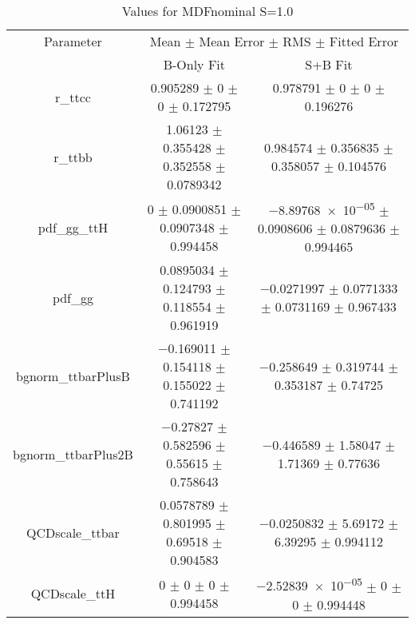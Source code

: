 \begin{table}
\centering
\caption{Values for MDFnominal S=1.0}
\begin{tabular}{ccc}
\toprule
Parameter & \multicolumn{2}{c}{Mean $\pm$ Mean Error $\pm$ RMS $\pm$ Fitted Error}\\
 & B-Only Fit & S+B Fit\\
\midrule
r\_ttcc & \num{0.905289} $\pm$ \num{0} $\pm$ \num{0} $\pm$ \num{0.172795} & \num{0.978791} $\pm$ \num{0} $\pm$ \num{0} $\pm$ \num{0.196276}\\
r\_ttbb & \num{1.06123} $\pm$ \num{0.355428} $\pm$ \num{0.352558} $\pm$ \num{0.0789342} & \num{0.984574} $\pm$ \num{0.356835} $\pm$ \num{0.358057} $\pm$ \num{0.104576}\\
pdf\_gg\_ttH & \num{0} $\pm$ \num{0.0900851} $\pm$ \num{0.0907348} $\pm$ \num{0.994458} & \num{-8.89768e-05} $\pm$ \num{0.0908606} $\pm$ \num{0.0879636} $\pm$ \num{0.994465}\\
pdf\_gg & \num{0.0895034} $\pm$ \num{0.124793} $\pm$ \num{0.118554} $\pm$ \num{0.961919} & \num{-0.0271997} $\pm$ \num{0.0771333} $\pm$ \num{0.0731169} $\pm$ \num{0.967433}\\
bgnorm\_ttbarPlusB & \num{-0.169011} $\pm$ \num{0.154118} $\pm$ \num{0.155022} $\pm$ \num{0.741192} & \num{-0.258649} $\pm$ \num{0.319744} $\pm$ \num{0.353187} $\pm$ \num{0.74725}\\
bgnorm\_ttbarPlus2B & \num{-0.27827} $\pm$ \num{0.582596} $\pm$ \num{0.55615} $\pm$ \num{0.758643} & \num{-0.446589} $\pm$ \num{1.58047} $\pm$ \num{1.71369} $\pm$ \num{0.77636}\\
QCDscale\_ttbar & \num{0.0578789} $\pm$ \num{0.801995} $\pm$ \num{0.69518} $\pm$ \num{0.904583} & \num{-0.0250832} $\pm$ \num{5.69172} $\pm$ \num{6.39295} $\pm$ \num{0.994112}\\
QCDscale\_ttH & \num{0} $\pm$ \num{0} $\pm$ \num{0} $\pm$ \num{0.994458} & \num{-2.52839e-05} $\pm$ \num{0} $\pm$ \num{0} $\pm$ \num{0.994448}\\
\bottomrule
\end{tabular}
\end{table}